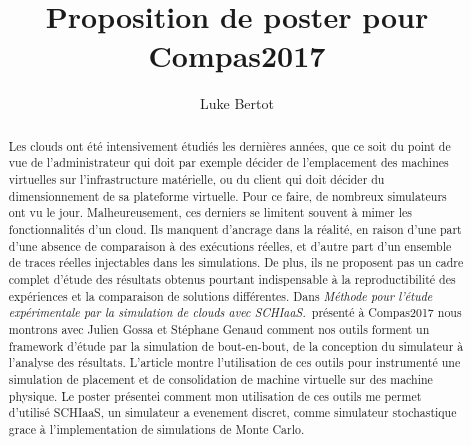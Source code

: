 \documentclass[parallelisme]{compas2017}
\title{Proposition de poster pour Compas2017}
\author{Luke Bertot}
\begin{document}
\maketitle


%

\begin{abstract} Les clouds ont été intensivement étudiés les dernières années,
	que ce soit du point de vue de l'administrateur qui doit par exemple
	décider de l'emplacement des machines virtuelles sur l'infrastructure
	matérielle, ou du client qui doit décider du dimensionnement de sa
	plateforme virtuelle. Pour ce faire, de nombreux simulateurs ont vu le
	jour. Malheureusement, ces derniers se limitent souvent à mimer les
	fonctionnalités d'un cloud. Ils manquent d'ancrage dans la réalité, en
	raison d'une part d'une absence de comparaison à des exécutions réelles,
	et d'autre part d'un ensemble de traces réelles injectables dans les
	simulations. De plus, ils ne proposent pas un cadre complet d'étude des
	résultats obtenus pourtant indispensable à la reproductibilité des
	expériences et la comparaison de solutions différentes. Dans
	\emph{Méthode pour l’étude expérimentale par la simulation de clouds
	avec SCHIaaS.}\ présenté à Compas2017 nous montrons avec Julien Gossa et
	Stéphane Genaud comment nos outils forment un framework d'étude par la
	simulation de bout-en-bout, de la conception du simulateur à l'analyse
	des résultats. L'article montre l'utilisation de ces outils pour
	instrumenté une simulation de placement et de consolidation de machine
	virtuelle sur des machine physique. Le poster présentei comment mon
	utilisation de ces outils me permet d'utilisé SCHIaaS, un simulateur a
	evenement discret, comme simulateur stochastique grace à 
	l'implementation de simulations de Monte Carlo.
	
	 \end{abstract}
\end{document}
